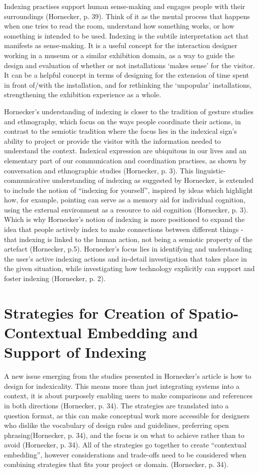 Indexing practises support human sense-making and engages people with their surroundings (Hornecker, p. 39). Think of it as the mental process that happens when one tries to read the room, understand how something works, or how something is intended to be used. Indexing is the subtile interpretation act that manifests as sense-making. It is a useful concept for the interaction designer working in a museum or a similar exhibition domain, as a way to guide the design and evaluation of whether or not installations ‘makes sense’ for the visitor. It can be a helpful concept in terms of designing for the extension of time spent in front of/with the installation, and for rethinking the ‘unpopular’ installations, strengthening the exhibition experience as a whole.

Hornecker’s understanding of indexing is closer to the tradition of gesture studies and ethnography, which focus on the ways people coordinate their actions, in contrast to the semiotic tradition where the focus lies in the indexical sign’s ability to project or provide the visitor with the information needed to understand the context. Indexical expression are ubiquitous in our lives and an elementary part of our communication and coordination practises, as shown by conversation and ethnographic studies (Hornecker, p. 3). This linguistic-communicative understanding of indexing as suggested by Hornecker, is extended to include the notion of “indexing for yourself”, inspired by ideas which highlight how, for example, pointing can serve as a memory aid for individual cognition, using the external environment as a resource to aid cognition (Hornecker, p. 3). Which is why Hornecker’s notion of indexing is more positioned to expand the idea that people actively index to make connections between different things - that indexing is linked to the human action, not being a semiotic property of the artefact (Hornecker, p.5). Hornecker’s focus lies in identifying and understanding the user’s active indexing actions and in-detail investigation that takes place in the given situation, while investigating how technology explicitly can support and foster indexing (Hornecker, p. 2).


\section{Strategies for Creation of Spatio-Contextual Embedding and Support of Indexing
}
A new issue emerging from the studies presented in Hornecker’s article is how to design for indexicality. This means more than just integrating systems into a context, it is about purposely enabling users to make comparisons and references in both directions (Hornecker, p. 34). The strategies are translated into a question format, as this can make conceptual work more accessible for designers who dislike the vocabulary of design rules and guidelines, preferring open phrasing(Hornecker, p. 34), and the focus is on what to achieve rather than to avoid (Hornecker, p. 34). All of the strategies go together to create “contextual embedding”, however considerations and trade-offs need to be considered when combining strategies that fits your project or domain. (Hornecker, p. 34).

